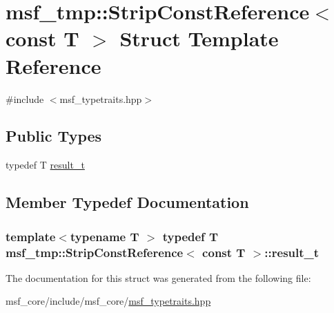 \hypertarget{structmsf__tmp_1_1StripConstReference_3_01const_01T_01_4}{\section{msf\-\_\-tmp\-:\-:Strip\-Const\-Reference$<$ const T $>$ Struct Template Reference}
\label{structmsf__tmp_1_1StripConstReference_3_01const_01T_01_4}
}


{\ttfamily \#include $<$msf\-\_\-typetraits.\-hpp$>$}

\subsection*{Public Types}
\begin{DoxyCompactItemize}
\item 
typedef T \hyperlink{structmsf__tmp_1_1StripConstReference_3_01const_01T_01_4_a37e22d99853f07caf2ae4ef4455e3d16}{result\-\_\-t}
\end{DoxyCompactItemize}


\subsection{Member Typedef Documentation}
\hypertarget{structmsf__tmp_1_1StripConstReference_3_01const_01T_01_4_a37e22d99853f07caf2ae4ef4455e3d16}{
\subsubsection[{result\-\_\-t}]{\setlength{\rightskip}{0pt plus 5cm}template$<$typename T $>$ typedef T {\bf msf\-\_\-tmp\-::\-Strip\-Const\-Reference}$<$ const T $>$\-::{\bf result\-\_\-t}}}\label{structmsf__tmp_1_1StripConstReference_3_01const_01T_01_4_a37e22d99853f07caf2ae4ef4455e3d16}


The documentation for this struct was generated from the following file\-:\begin{DoxyCompactItemize}
\item 
msf\-\_\-core/include/msf\-\_\-core/\hyperlink{msf__typetraits_8hpp}{msf\-\_\-typetraits.\-hpp}\end{DoxyCompactItemize}
